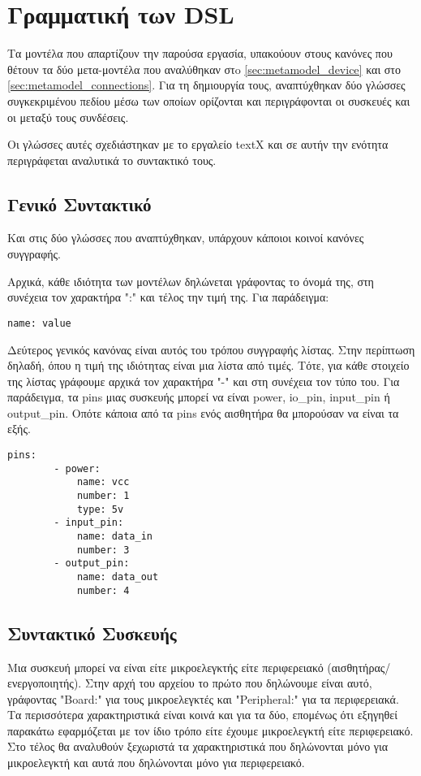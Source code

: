 \section{Γραμματική των DSL}
\label{sec:dsl}

Τα μοντέλα που απαρτίζουν την παρούσα εργασία, υπακούουν στους κανόνες που θέτουν τα δύο μετα-μοντέλα που αναλύθηκαν στo \autoref{sec:metamodel_device} και στο \autoref{sec:metamodel_connections}. Για τη δημιουργία τους, αναπτύχθηκαν δύο γλώσσες συγκεκριμένου πεδίου μέσω των οποίων ορίζονται και περιγράφονται οι συσκευές και οι μεταξύ τους συνδέσεις.

Οι γλώσσες αυτές σχεδιάστηκαν με το εργαλείο textX και σε αυτήν την ενότητα περιγράφεται αναλυτικά το συντακτικό τους.

\subsection{Γενικό Συντακτικό}
\label{subsec:syntax}
Και στις δύο γλώσσες που αναπτύχθηκαν, υπάρχουν κάποιοι κοινοί κανόνες συγγραφής.

Αρχικά, κάθε ιδιότητα των μοντέλων δηλώνεται γράφοντας το όνομά της, στη συνέχεια τον χαρακτήρα ":" και τέλος την τιμή της. Για παράδειγμα:

\begin{lstlisting}[title={Παράδειγμα ανάθεσης τιμής σε ιδιότητα}]
	name: value
\end{lstlisting}

Δεύτερος γενικός κανόνας είναι αυτός του τρόπου συγγραφής λίστας. Στην περίπτωση δηλαδή, όπου η τιμή της ιδιότητας είναι μια λίστα από τιμές. Τότε, για κάθε στοιχείο της λίστας γράφουμε αρχικά τον χαρακτήρα "-" και στη συνέχεια τον τύπο του. Για παράδειγμα, τα pins μιας συσκευής μπορεί να είναι power, io\_pin, input\_pin ή output\_pin. Οπότε κάποια από τα pins ενός αισθητήρα θα μπορούσαν να είναι τα εξής.

\begin{lstlisting}[title={Παράδειγμα ορισμού pins αισθητήρα}]
	pins:
		- power:
			name: vcc
			number: 1
			type: 5v
		- input_pin:
			name: data_in
			number: 3
		- output_pin:
			name: data_out
			number: 4
\end{lstlisting}

\subsection{Συντακτικό Συσκευής}
\label{subsec:syntax_device}

Μια συσκευή μπορεί να είναι είτε μικροελεγκτής είτε περιφερειακό (αισθητήρας/ενεργοποιητής). Στην αρχή του αρχείου το πρώτο που δηλώνουμε είναι αυτό, γράφοντας "Board:" για τους μικροελεγκτές και "Peripheral:" για τα περιφερειακά. Τα περισσότερα χαρακτηριστικά είναι κοινά και για τα δύο, επομένως ότι εξηγηθεί παρακάτω εφαρμόζεται με τον ίδιο τρόπο είτε έχουμε μικροελεγκτή είτε περιφερειακό. Στο τέλος θα αναλυθούν ξεχωριστά τα χαρακτηριστικά που δηλώνονται μόνο για μικροελεγκτή και αυτά που δηλώνονται μόνο για περιφερειακό.

